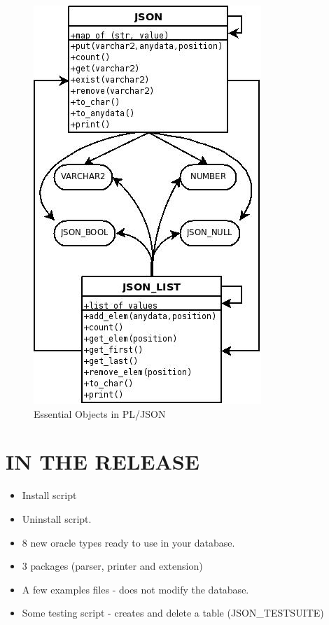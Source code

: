 \documentclass[11pt,twocolumn, a4paper]{article}
\begin{document}
\begin{figure}[!ht]
  \begin{center}
    \includegraphics[width=0.8\linewidth]{visual.jpg}
  \end{center} 
  \caption{Essential Objects in PL/JSON}
  \label{howjsonwork}
\end{figure}

\section*{IN THE RELEASE}
\begin{itemize}
\item Install script
\item Uninstall script.
\item 8 new oracle types ready to use in your database.
\item 3 packages (parser, printer and extension)
\item A few examples files - does not modify the database.
\item Some testing script - creates and delete a table (JSON\_TESTSUITE)
\end{itemize}
\end{document}
